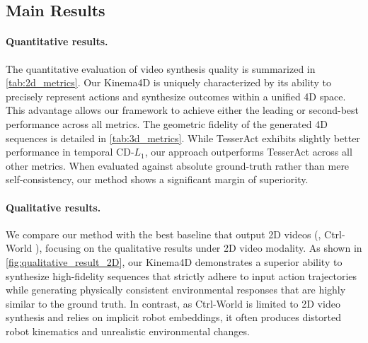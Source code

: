 \subsection{Main Results}

\paragraph{Quantitative results.}
The quantitative evaluation of video synthesis quality is summarized in \cref{tab:2d_metrics}. Our Kinema4D is uniquely characterized by its ability to precisely represent actions and synthesize outcomes within a unified 4D space. This advantage allows our framework to achieve either the leading or second-best performance across all metrics. The geometric fidelity of the generated 4D sequences is detailed in \cref{tab:3d_metrics}. While TesserAct \cite{zhen2025tesseract} exhibits slightly better performance in temporal CD-$L_1$, our approach outperforms TesserAct across all other metrics. When evaluated against absolute ground-truth rather than mere self-consistency, our method shows a significant margin of superiority.

\paragraph{Qualitative results.}
We compare our method with the best baseline that output 2D videos (\ie, Ctrl-World \cite{guo2026ctrl}), focusing on the qualitative results under 2D video modality. As shown in \cref{fig:qualitative_result_2D}, our Kinema4D demonstrates a superior ability to synthesize high-fidelity sequences that strictly adhere to input action trajectories while generating physically consistent environmental responses that are highly similar to the ground truth. In contrast, as Ctrl-World is limited to 2D video synthesis and relies on implicit robot embeddings, it often produces distorted robot kinematics and unrealistic environmental changes.

